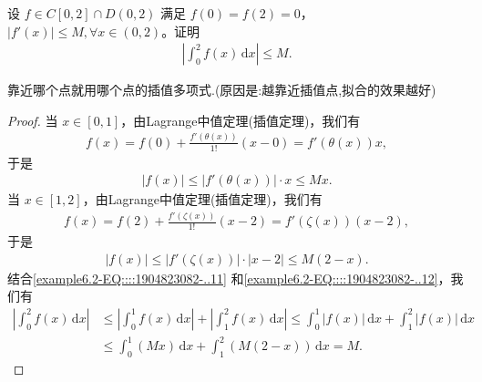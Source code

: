 \documentclass[../../main.tex]{subfiles}%
\begin{document}
\begin{example}
设 $f \in C[0,2] \cap D(0,2)$ 满足 $f(0) = f(2) = 0$，$|f'(x)| \leqslant  M, \forall x \in (0,2)$。证明
\begin{align*}
\left| \int_{0}^{2} f(x) \, \mathrm{d}x \right| \leqslant  M.
\end{align*}
\end{example}
\begin{note}
靠近哪个点就用哪个点的插值多项式.(原因是:越靠近插值点,拟合的效果越好)
\end{note}
\begin{proof}
当 $x \in [0,1]$，由Lagrange中值定理(插值定理)，我们有
\begin{align*}
f(x) = f(0) + \frac{f'(\theta(x))}{1!} (x - 0) = f'(\theta(x)) x,
\end{align*}
于是
\begin{align}
|f(x)| \leqslant  |f'(\theta(x))| \cdot x \leqslant  Mx.\label{example6.2-EQ::::1904823082-..11}
\end{align}
当 $x \in [1,2]$，由Lagrange中值定理(插值定理)，我们有
\begin{align*}
f(x) = f(2) + \frac{f'(\zeta(x))}{1!} (x - 2) = f'(\zeta(x)) (x - 2),
\end{align*}
于是
\begin{align}
|f(x)| \leqslant  |f'(\zeta(x))| \cdot |x - 2| \leqslant  M(2 - x).\label{example6.2-EQ::::1904823082-..12}
\end{align}
结合\eqref{example6.2-EQ::::1904823082-..11} 和\eqref{example6.2-EQ::::1904823082-..12}，我们有
\begin{align*}
\left| \int_{0}^{2} f(x) \, \mathrm{d}x \right| &\leqslant  \left| \int_{0}^{1} f(x) \, \mathrm{d}x \right| + \left| \int_{1}^{2} f(x) \, \mathrm{d}x \right| 
\leqslant  \int_{0}^{1} |f(x)| \, \mathrm{d}x + \int_{1}^{2} |f(x)| \, \mathrm{d}x \\
&\leqslant  \int_{0}^{1} (Mx) \, \mathrm{d}x + \int_{1}^{2} (M(2 - x)) \, \mathrm{d}x 
= M.
\end{align*}
\end{proof}
\end{document}
